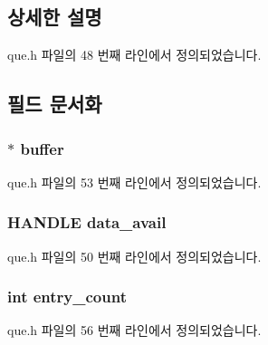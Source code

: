\subsection{상세한 설명}


que.\+h 파일의 48 번째 라인에서 정의되었습니다.



\subsection{필드 문서화}
\subsubsection[{\texorpdfstring{buffer}{buffer}}]{$\ast$ buffer}\hypertarget{structque__def_a56ed84df35de10bdb65e72b184309497}{}\label{structque__def_a56ed84df35de10bdb65e72b184309497}


que.\+h 파일의 53 번째 라인에서 정의되었습니다.

\subsubsection[{\texorpdfstring{data\+\_\+avail}{data_avail}}]{\setlength{\rightskip}{0pt plus 5cm}H\+A\+N\+D\+LE data\+\_\+avail}\hypertarget{structque__def_a94538cc7ead72cb3b5f43d12f42ec148}{}\label{structque__def_a94538cc7ead72cb3b5f43d12f42ec148}


que.\+h 파일의 50 번째 라인에서 정의되었습니다.

\subsubsection[{\texorpdfstring{entry\+\_\+count}{entry_count}}]{\setlength{\rightskip}{0pt plus 5cm}int entry\+\_\+count}\hypertarget{structque__def_af4144b5c7df947d23550c7c0b8b6afff}{}\label{structque__def_af4144b5c7df947d23550c7c0b8b6afff}


que.\+h 파일의 56 번째 라인에서 정의되었습니다.

